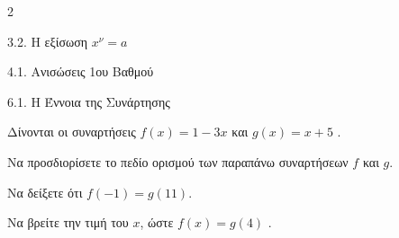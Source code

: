 \begin{ylh}{2}
    \item 3.2. Η εξίσωση $x^{\nu}=a$
    \item 4.1. Ανισώσεις 1ου Βαθμού
    \item 6.1. Η Έννοια της Συνάρτησης
\end{ylh}
Δίνονται οι συναρτήσεις $f(x) = 1 - 3x$ και $g(x) = x + 5$ .
\begin{alist}
\item Να προσδιορίσετε το πεδίο ορισμού των παραπάνω συναρτήσεων $f$ και $g$.
\item Να δείξετε ότι $f(-1) = g(11)$.
\item Να βρείτε την τιμή του $x$, ώστε $f(x) = g(4)$ .
\end{alist}

